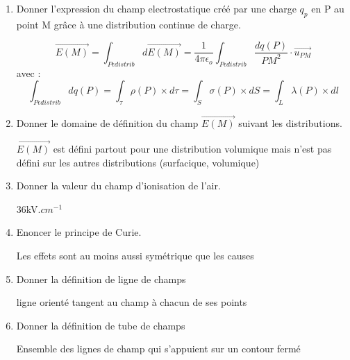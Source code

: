 \begin{enumerate}[label=\arabic{enumi} - , left=0pt, itemsep=1em]
    \item Donner l'expression du champ electrostatique créé par une charge $q_p$ en P au point M grâce à une distribution continue de charge. \par
    \begin{solution}
          \[ \vec{E(M)} = \int_{P \epsilon distrib} d\vec{E(M)} = \frac{1}{4 \pi \epsilon_o} \int_{P \epsilon distrib} \frac{dq(P)}{PM^2} \cdot \vec{u_{PM}} \]
          avec : 
          \[ \int_{P \epsilon distrib} dq(P)  = \int_\tau \rho(P) \times d\tau =\int_S \sigma(P) \times dS = \int_L \lambda(P) \times dl \]   
  
    \end{solution}

    \item Donner le domaine de définition du champ $\vec{E(M)}$ suivant les distributions. \par
    \begin{solution}
     $\vec{E(M)}$ est défini partout pour une distribution volumique mais n'est pas défini sur les autres distributions (surfacique, volumique)
  
    \end{solution}

    \item Donner la valeur du champ d'ionisation de l'air. \par
    \begin{solution}
     36kV.$cm^{-1}$
  
    \end{solution}
    
    \item Enoncer le principe de Curie. \par
    \begin{solution}
     Les effets sont au moins aussi symétrique que les causes
     \end{solution}

     \item Donner la définition de ligne de champs \par
     \begin{solution}
      ligne orienté tangent au champ à chacun de ses points
     \end{solution}

     \item Donner la définition de tube de champs \par
     \begin{solution}
      Ensemble des lignes de champ qui s'appuient sur un contour fermé 
     \end{solution}
\end{enumerate}